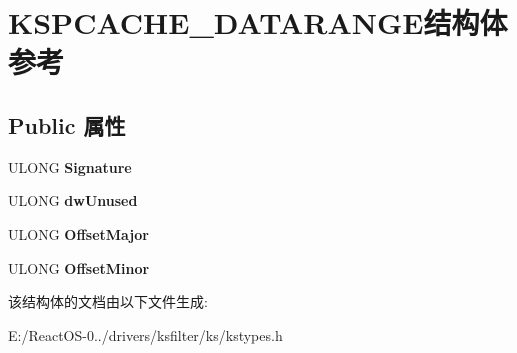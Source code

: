 \hypertarget{struct_k_s_p_c_a_c_h_e___d_a_t_a_r_a_n_g_e}{}\section{K\+S\+P\+C\+A\+C\+H\+E\+\_\+\+D\+A\+T\+A\+R\+A\+N\+G\+E结构体 参考}
\label{struct_k_s_p_c_a_c_h_e___d_a_t_a_r_a_n_g_e}
\subsection*{Public 属性}
\begin{DoxyCompactItemize}
\item 
\mbox{\label{struct_k_s_p_c_a_c_h_e___d_a_t_a_r_a_n_g_e_a0a3c3bf6a9782308895a94ab11247314}} 
U\+L\+O\+NG {\bfseries Signature}
\item 
\mbox{\label{struct_k_s_p_c_a_c_h_e___d_a_t_a_r_a_n_g_e_a7c2c88925a2a2427f5185f176705df34}} 
U\+L\+O\+NG {\bfseries dw\+Unused}
\item 
\mbox{\label{struct_k_s_p_c_a_c_h_e___d_a_t_a_r_a_n_g_e_ad2a54398907c39161e24aca8cfd094a9}} 
U\+L\+O\+NG {\bfseries Offset\+Major}
\item 
\mbox{\label{struct_k_s_p_c_a_c_h_e___d_a_t_a_r_a_n_g_e_a854ef9fca200a52c8f4ca6f40e981852}} 
U\+L\+O\+NG {\bfseries Offset\+Minor}
\end{DoxyCompactItemize}


该结构体的文档由以下文件生成\+:\begin{DoxyCompactItemize}
\item 
E\+:/\+React\+O\+S-\/0../drivers/ksfilter/ks/kstypes.\+h\end{DoxyCompactItemize}

